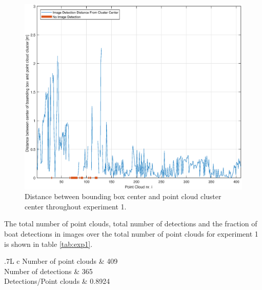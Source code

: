\begin{figure}[H]
	\centering
	\includegraphics[width=.7\linewidth]{fig/exp_1_dist_pr_pc.eps}
	\caption{Distance between bounding box center and point cloud cluster center throughout experiment 1.}
	\label{fig:ex1_pc_dist}
\end{figure}
The total number of point clouds, total number of detections and the fraction of boat detections in images over the total number of point clouds for experiment 1 is shown in table \ref{tab:exp1}.
\begin{table}[H]
	\centering
	\begin{tabularx}{.7\linewidth}{L c}
		\toprule
		Number of point clouds & 409\\
		\midrule
		Number of detections & 365\\
		\midrule
	    Detections/Point clouds & 0.8924 \\
		\bottomrule
	\end{tabularx}
\caption{Data from experiment 1.}
\label{tab:exp1}
\end{table}
